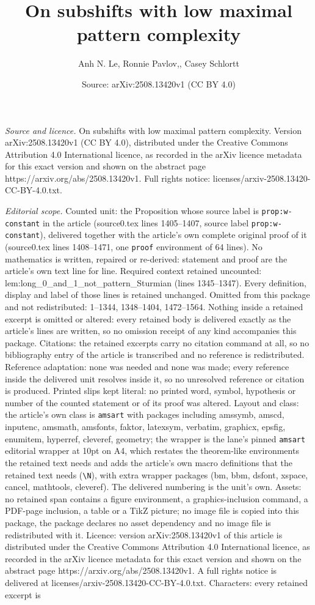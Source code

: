 \documentclass[10pt,a4paper]{amsart}
\title[On subshifts with low maximal pattern complexity]{On subshifts with low maximal pattern complexity}
\author{Anh N. Le, Ronnie Pavlov,, Casey Schlortt}
\date{Source: arXiv:2508.13420v1 (CC BY 4.0)}
\begin{document}
\maketitle

\noindent\emph{Source and licence.} On subshifts with low maximal pattern complexity. Version arXiv:2508.13420v1 (CC BY 4.0), distributed under the Creative Commons Attribution 4.0 International licence, as recorded in the arXiv licence metadata for this exact version and shown on the abstract page https://arxiv.org/abs/2508.13420v1. Full rights notice: licenses/arxiv-2508.13420-CC-BY-4.0.txt.\par\smallskip

\noindent\textit{Editorial scope.} Counted unit: the Proposition whose source label is \texttt{prop:w-constant} in the article (source0.tex lines 1405--1407, source label \texttt{prop:w-constant}), delivered together with the article's own complete original proof of it (source0.tex lines 1408--1471, one \texttt{proof} environment of 64 lines). No mathematics is written, repaired or re-derived: statement and proof are the article's own text line for line. Required context retained uncounted: lem:long\_0\_and\_1\_not\_pattern\_Sturmian (lines 1345--1347). Every definition, display and label of those lines is retained unchanged. Omitted from this package and not redistributed: 1--1344, 1348--1404, 1472--1564. Nothing inside a retained excerpt is omitted or altered: every retained body is delivered exactly as the article's lines are written, so no omission receipt of any kind accompanies this package. Citations: the retained excerpts carry no citation command at all, so no bibliography entry of the article is transcribed and no reference is redistributed. Reference adaptation: none was needed and none was made; every reference inside the delivered unit resolves inside it, so no unresolved reference or citation is produced. Printed slips kept literal: no printed word, symbol, hypothesis or number of the counted statement or of its proof was altered. Layout and class: the article's own class is \texttt{amsart} with packages including amssymb, amscd, inputenc, amsmath, amsfonts, faktor, latexsym, verbatim, graphicx, epsfig, enumitem, hyperref, cleveref, geometry; the wrapper is the lane's pinned \texttt{amsart} editorial wrapper at 10pt on A4, which restates the theorem-like environments the retained text needs and adds the article's own macro definitions that the retained text needs (\texttt{\textbackslash N}), with extra wrapper packages (bm, bbm, dsfont, xspace, cancel, mathtools, cleveref). The delivered numbering is the unit's own. Assets: no retained span contains a figure environment, a graphics-inclusion command, a PDF-page inclusion, a table or a TikZ picture; no image file is copied into this package, the package declares no asset dependency and no image file is redistributed with it. Licence: version arXiv:2508.13420v1 of this article is distributed under the Creative Commons Attribution 4.0 International licence, as recorded in the arXiv licence metadata for this exact version and shown on the abstract page https://arxiv.org/abs/2508.13420v1. A full rights notice is delivered at licenses/arxiv-2508.13420-CC-BY-4.0.txt. Characters: every retained excerpt is 
\end{document}

